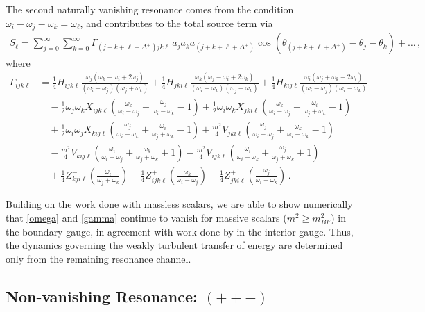 \documentclass[letterpaper,11pt]{article}
\newcommand{\oi}{\omega_i}
\newcommand{\oj}{\omega_j}
\newcommand{\ok}{\omega_k}
\newcommand{\ol}{\omega_\ell}
\newcommand{\thj}{\theta_j}
\newcommand{\thk}{\theta_k}
\begin{document}
The second naturally vanishing resonance comes from the condition $\oi - \oj - \ok = \ol$, and contributes to the total source term via
\begin{align}
S_\ell = \sum_{j=0}^\infty \sum_{k=0}^\infty \Gamma_{(j + k + \ell + \Delta^+) jk\ell} \, a_j a_k a_{(j+k+\ell + \Delta^+)} \cos \left( \theta_{(j+k+\ell + \Delta^+)} - \thj - \thk \right) + \ldots \, ,
\end{align}
where
\begin{align}
\label{gamma}
\Gamma_{ijk\ell} &= \frac{1}{4} H_{ijk\ell} \frac{\oj (\ok - \oi + 2\oj)}{(\oi - \oj)(\oj + \ok)} + \frac{1}{4} H_{jki\ell} \frac{\ok (\oj - \oi + 2\ok)}{(\oi - \ok)(\oj + \ok)} + \frac{1}{4} H_{kij\ell} \frac{\oi (\oj + \ok - 2\oi)}{(\oi - \oj)(\oi - \ok)} \nonumber \\
% 
& \quad -\frac{1}{2} \oj \ok X_{ijk\ell} \left( \frac{\ok}{\oi - \oj} + \frac{\oj}{\oi - \ok} - 1\right) + \frac{1}{2} \oi \ok X_{jki\ell} \left( \frac{\ok}{\oi - \oj} + \frac{\oi}{\oj + \ok} - 1 \right) \nonumber \\
%
& \quad + \frac{1}{2} \oi \oj X_{kij\ell} \left( \frac{\oj}{\oi - \ok} + \frac{\oi}{\oj + \ok} -1 \right) + \frac{m^2}{4} V_{jki\ell} \left( \frac{\oj}{\oi - \oj} + \frac{\ok}{\oi - \ok} -1\right) \nonumber \\
%
& \quad - \frac{m^2}{4} V_{kij\ell} \left( \frac{\oi}{\oi - \oj} + \frac{\ok}{\oj + \ok} + 1\right) - \frac{m^2}{4} V_{ijk\ell} \left( \frac{\oi}{\oi - \ok} + \frac{\oj}{\oj + \ok} + 1 \right) \nonumber \\
%
& \quad + \frac{1}{4} Z^-_{kji\ell} \left( \frac{\oi}{\oj + \ok}\right) - \frac{1}{4} Z^+_{ijk\ell} \left( \frac{\ok}{\oi - \oj} \right) - \frac{1}{4} Z^+_{jki\ell} \left( \frac{\oj}{\oi - \ok}\right) \, .
\end{align}

Building on the work done with massless scalars, we are able to show numerically that \eqref{omega} and \eqref{gamma} continue to vanish for massive scalars ($m^2 \geq m^2_{BF}$) in the boundary gauge, in agreement with work done by \cite{1810.04753} in the interior gauge. Thus, the dynamics governing the weakly turbulent transfer of energy are determined only from the remaining resonance channel. 


\subsection{Non-vanishing Resonance: $(++-)$}
\label{subs: ttf resonances}
\end{document}
